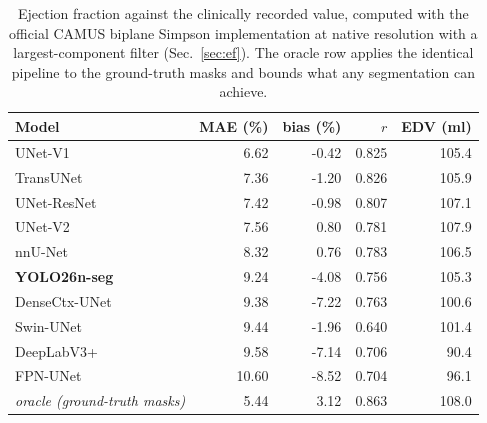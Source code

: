 \begin{table}[t]
\centering
\caption{Ejection fraction against the clinically recorded value, computed with the official CAMUS biplane Simpson implementation at native resolution with a largest-component filter (Sec.~\ref{sec:ef}). The oracle row applies the identical pipeline to the ground-truth masks and bounds what any segmentation can achieve.}
\label{tab:ef}
\small
\begin{tabular}{lrrrr}
\toprule
Model & MAE (\%) & bias (\%) & $r$ & EDV (ml) \\
\midrule
UNet-V1 & 6.62 & -0.42 & 0.825 & 105.4 \\
TransUNet & 7.36 & -1.20 & 0.826 & 105.9 \\
UNet-ResNet & 7.42 & -0.98 & 0.807 & 107.1 \\
UNet-V2 & 7.56 & 0.80 & 0.781 & 107.9 \\
nnU-Net & 8.32 & 0.76 & 0.783 & 106.5 \\
\textbf{YOLO26n-seg} & 9.24 & -4.08 & 0.756 & 105.3 \\
DenseCtx-UNet & 9.38 & -7.22 & 0.763 & 100.6 \\
Swin-UNet & 9.44 & -1.96 & 0.640 & 101.4 \\
DeepLabV3+ & 9.58 & -7.14 & 0.706 & 90.4 \\
FPN-UNet & 10.60 & -8.52 & 0.704 & 96.1 \\
\midrule
\textit{oracle (ground-truth masks)} & 5.44 & 3.12 & 0.863 & 108.0 \\
\bottomrule
\end{tabular}
\end{table}

